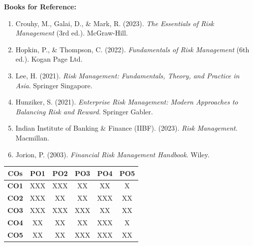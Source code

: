 \noindent\textbf{\footnotesize Books for Reference:}
\begin{enumerate}[leftmargin=1.2em, label=\arabic*., itemsep=0.5pt, topsep=1pt, parsep=0pt]
    \scriptsize
    \item Crouhy, M., Galai, D., \& Mark, R. (2023). \textit{The Essentials of Risk Management} (3rd ed.). McGraw-Hill.
    \item Hopkin, P., \& Thompson, C. (2022). \textit{Fundamentals of Risk Management} (6th ed.). Kogan Page Ltd.
    \item Lee, H. (2021). \textit{Risk Management: Fundamentals, Theory, and Practice in Asia}. Springer Singapore.
    \item Hunziker, S. (2021). \textit{Enterprise Risk Management: Modern Approaches to Balancing Risk and Reward}. Springer Gabler.
    \item Indian Institute of Banking \& Finance (IIBF). (2023). \textit{Risk Management}. Macmillan.
    \item Jorion, P. (2003). \textit{Financial Risk Management Handbook}. Wiley.
\end{enumerate}

\vspace{0.2em}
\begin{center}
\scriptsize
\setlength{\tabcolsep}{8pt}
\begin{tabular}{|c|c|c|c|c|c|}
\hline
\textbf{COs} & \textbf{PO1} & \textbf{PO2} & \textbf{PO3} & \textbf{PO4} & \textbf{PO5} \\
\hline
\textbf{CO1} & XXX & XXX & XX & XX & X \\
\hline
\textbf{CO2} & XXX & XX & XX & XXX & XX \\
\hline
\textbf{CO3} & XXX & XXX & XXX & XX & XX \\
\hline
\textbf{CO4} & XX & XX & XX & XXX & X \\
\hline
\textbf{CO5} & XX & XX & XXX & XXX & XX \\
\hline
\end{tabular}
\end{center}
\vspace{-0.5em}
